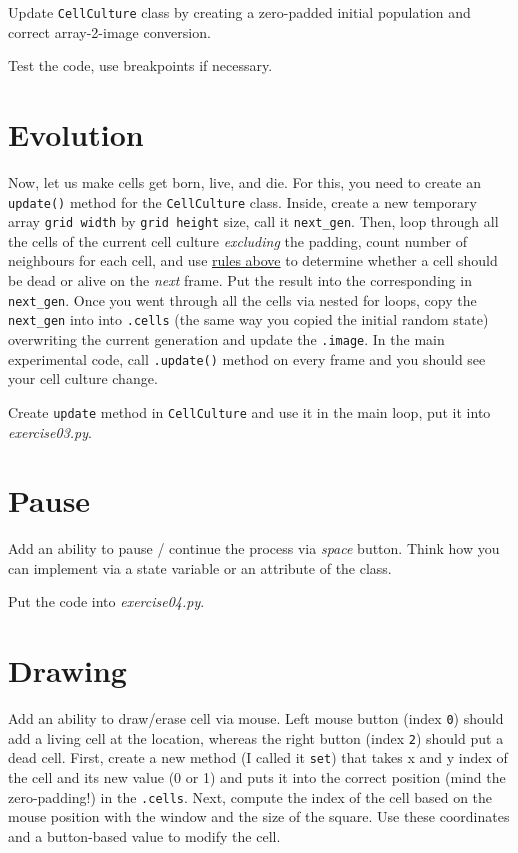 \documentclass[
]{book}
\begin{document}
Update \texttt{CellCulture} class by creating a zero-padded initial population and correct array-2-image conversion.

Test the code, use breakpoints if necessary.

\hypertarget{evolution}{%
\section{Evolution}\label{evolution}}

Now, let us make cells get born, live, and die. For this, you need to create an \texttt{update()} method for the \texttt{CellCulture} class. Inside, create a new temporary array \texttt{grid\ width} by \texttt{grid\ height} size, call it \texttt{next\_gen}. Then, loop through all the cells of the current cell culture \emph{excluding} the padding, count number of neighbours for each cell, and use \protect\hyperlink{seminar-02-08}{rules above} to determine whether a cell should be dead or alive on the \emph{next} frame. Put the result into the corresponding in \texttt{next\_gen}. Once you went through all the cells via nested for loops, copy the \texttt{next\_gen} into into \texttt{.cells} (the same way you copied the initial random state) overwriting the current generation and update the \texttt{.image}. In the main experimental code, call \texttt{.update()} method on every frame and you should see your cell culture change.

Create \texttt{update} method in \texttt{CellCulture} and use it in the main loop, put it into \emph{exercise03.py}.

\hypertarget{pause}{%
\section{Pause}\label{pause}}

Add an ability to pause / continue the process via \emph{space} button. Think how you can implement via a state variable or an attribute of the class.

Put the code into \emph{exercise04.py}.

\hypertarget{drawing}{%
\section{Drawing}\label{drawing}}

Add an ability to draw/erase cell via mouse. Left mouse button (index \texttt{0}) should add a living cell at the location, whereas the right button (index \texttt{2}) should put a dead cell. First, create a new method (I called it \texttt{set}) that takes x and y index of the cell and its new value (0 or 1) and puts it into the correct position (mind the zero-padding!) in the \texttt{.cells}. Next, compute the index of the cell based on the mouse position with the window and the size of the square. Use these coordinates and a button-based value to modify the cell.
\end{document}
